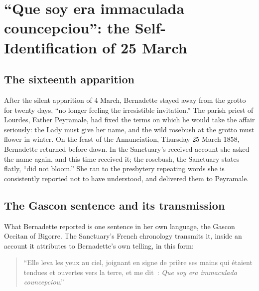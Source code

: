 \section{``Que soy era immaculada councepciou'': the
Self-Identification of 25 March}

\subsection{The sixteenth apparition}

After the silent apparition of 4 March, Bernadette stayed away from
the grotto for twenty days, ``no longer feeling the irresistible
invitation.'' The parish priest of Lourdes, Father Peyramale,
had fixed the terms on which he would take the affair seriously: the
Lady must give her name, and the wild rosebush at the grotto must
flower in winter. On the feast of the Annunciation, Thursday 25
March 1858, Bernadette returned before dawn. In the Sanctuary's
received account she asked the name again, and this time received
it; the rosebush, the Sanctuary states flatly, ``did not
bloom.'' She ran to the presbytery repeating words she is
consistently reported not to have understood, and delivered them to
Peyramale.

\subsection{The Gascon sentence and its transmission}

What Bernadette reported is one sentence in her own language, the
Gascon Occitan of Bigorre. The Sanctuary's French chronology
transmits it, inside an account it attributes to Bernadette's own
telling, in this form:

\begin{quote}
``Elle leva les yeux au ciel, joignant en signe de pri\`ere ses
mains qui \'etaient tendues et ouvertes vers la terre, et me dit~:
\emph{Que soy era immaculada councepciou}.''
\end{quote}

